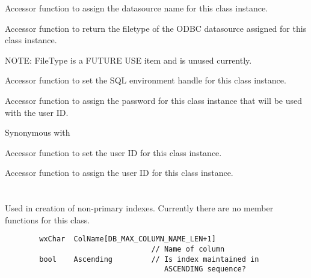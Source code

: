 \label{wxdbconnectinfsetdsn}


Accessor function to assign the datasource name for this class instance.


\label{wxdbconnectinfsetfiletype}


Accessor function to return the filetype of the ODBC datasource assigned for 
this class instance.

NOTE: FileType is a FUTURE USE item and is unused currently.


\label{wxdbconnectinfsethenv}


Accessor function to set the SQL environment handle for this class instance.


\label{wxdbconnectinfsetpassword}


Accessor function to assign the password for this class 
instance that will be used with the user ID.

Synonymous with 


\label{wxdbconnectinfsetuid}


Accessor function to set the user ID for this class instance.


\label{wxdbconnectinfsetuserid}


Accessor function to assign the user ID for this class instance.



\section{}\label{wxdbidxdef}

Used in creation of non-primary indexes.  Currently there are no member 
functions for this class.

\begin{verbatim}
        wxChar  ColName[DB_MAX_COLUMN_NAME_LEN+1] 
                                  // Name of column
        bool    Ascending         // Is index maintained in 
                                     ASCENDING sequence?
\end{verbatim}

